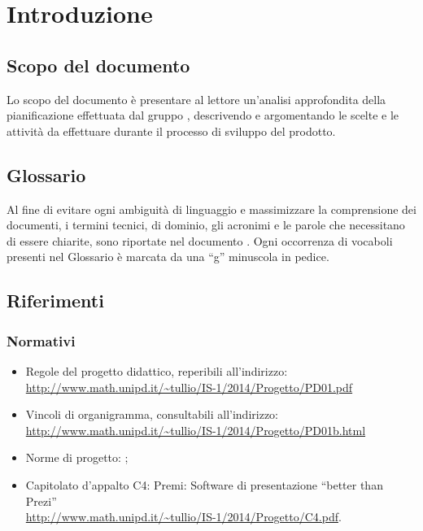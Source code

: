 \section{Introduzione}
\subsection{Scopo del documento}
Lo scopo del documento è presentare al lettore un'analisi approfondita della pianificazione effettuata dal gruppo \gruppo, descrivendo e argomentando le scelte e le attività da effettuare durante il processo di sviluppo del prodotto.
\subsection{Glossario}
Al fine di evitare ogni ambiguità di linguaggio e massimizzare la comprensione dei documenti, i termini tecnici, di dominio, gli acronimi e le parole che necessitano di essere chiarite, sono riportate nel documento \href{run:../../Esterni/\fGlossario}{\fEscapeGlossario}. Ogni occorrenza di vocaboli presenti nel Glossario è marcata da una “g” minuscola in pedice.
\subsection{Riferimenti}

\subsubsection{Normativi}
\begin{itemize}

\item Regole del progetto didattico, reperibili all'indirizzo:\\ \url{http://www.math.unipd.it/~tullio/IS-1/2014/Progetto/PD01.pdf}
\item Vincoli di organigramma, consultabili all’indirizzo:\\ \url{http://www.math.unipd.it/~tullio/IS-1/2014/Progetto/PD01b.html}
\item Norme di progetto: \href{run:../../Interni/\fNormeDiProgetto}{\fEscapeNormeDiProgetto};
\item Capitolato d’appalto C4: Premi: Software di presentazione “better than Prezi” \\
\url{http://www.math.unipd.it/~tullio/IS-1/2014/Progetto/C4.pdf}.
\end{itemize}

